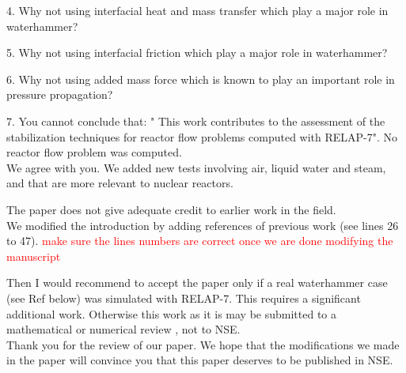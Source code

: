 \documentclass{article}
\newcommand{\tcr}[1]{\textcolor{red}{#1}}
\begin{document}
{\color{blue}
4. Why not using interfacial heat and mass transfer which play a major role in waterhammer? \\
}

\bigskip

{\color{blue}
5. Why not using interfacial friction which play a major role in waterhammer? \\
}

\bigskip

{\color{blue}
6. Why not using added mass force which is known to play an important role in pressure propagation? \\
}

\bigskip

{\color{blue}
7. You cannot conclude that: " This work contributes to the assessment of the stabilization techniques for reactor flow problems computed with RELAP-7". No reactor flow problem was computed. \\
}
We agree with you. We added new tests involving air, liquid water and steam, and that are more relevant to nuclear reactors. 
\bigskip

{\color{blue}
The paper does not give adequate credit to earlier work in the field. \\
}
We modified the introduction by adding references of previous work (see lines 26 to 47).
\tcr{make sure the lines numbers are correct once we are done modifying the manuscript}

\bigskip

{\color{blue}
Then I would recommend to accept the paper only if a real waterhammer case (see Ref below) was simulated with RELAP-7. This requires a significant additional work.
Otherwise this work as it is may be submitted to a mathematical or numerical review , not to NSE. \\
}
Thank you for the review of our paper. We hope that the modifications we made in the paper will convince you that this paper deserves to be published in NSE.
\end{document}

